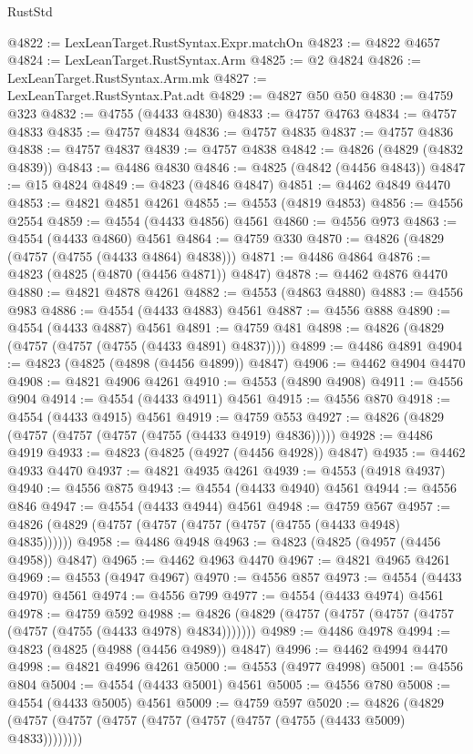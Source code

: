\begin{lexlean}{RustStd}
\begin{coremodule}
@4822 := LexLeanTarget.RustSyntax.Expr.matchOn
@4823 := @4822 @4657
@4824 := LexLeanTarget.RustSyntax.Arm
@4825 := @2 @4824
@4826 := LexLeanTarget.RustSyntax.Arm.mk
@4827 := LexLeanTarget.RustSyntax.Pat.adt
@4829 := @4827 @50 @50
@4830 := @4759 @323
@4832 := @4755 (@4433 @4830)
@4833 := @4757 @4763
@4834 := @4757 @4833
@4835 := @4757 @4834
@4836 := @4757 @4835
@4837 := @4757 @4836
@4838 := @4757 @4837
@4839 := @4757 @4838
@4842 := @4826 (@4829 (@4832 @4839))
@4843 := @4486 @4830
@4846 := @4825 (@4842 (@4456 @4843))
@4847 := @15 @4824
@4849 := @4823 (@4846 @4847)
@4851 := @4462 @4849 @4470
@4853 := @4821 @4851 @4261
@4855 := @4553 (@4819 @4853)
@4856 := @4556 @2554
@4859 := @4554 (@4433 @4856) @4561
@4860 := @4556 @973
@4863 := @4554 (@4433 @4860) @4561
@4864 := @4759 @330
@4870 := @4826 (@4829 (@4757 (@4755 (@4433 @4864) @4838)))
@4871 := @4486 @4864
@4876 := @4823 (@4825 (@4870 (@4456 @4871)) @4847)
@4878 := @4462 @4876 @4470
@4880 := @4821 @4878 @4261
@4882 := @4553 (@4863 @4880)
@4883 := @4556 @983
@4886 := @4554 (@4433 @4883) @4561
@4887 := @4556 @888
@4890 := @4554 (@4433 @4887) @4561
@4891 := @4759 @481
@4898 := @4826 (@4829 (@4757 (@4757 (@4755 (@4433 @4891) @4837))))
@4899 := @4486 @4891
@4904 := @4823 (@4825 (@4898 (@4456 @4899)) @4847)
@4906 := @4462 @4904 @4470
@4908 := @4821 @4906 @4261
@4910 := @4553 (@4890 @4908)
@4911 := @4556 @904
@4914 := @4554 (@4433 @4911) @4561
@4915 := @4556 @870
@4918 := @4554 (@4433 @4915) @4561
@4919 := @4759 @553
@4927 := @4826 (@4829 (@4757 (@4757 (@4757 (@4755 (@4433 @4919) @4836)))))
@4928 := @4486 @4919
@4933 := @4823 (@4825 (@4927 (@4456 @4928)) @4847)
@4935 := @4462 @4933 @4470
@4937 := @4821 @4935 @4261
@4939 := @4553 (@4918 @4937)
@4940 := @4556 @875
@4943 := @4554 (@4433 @4940) @4561
@4944 := @4556 @846
@4947 := @4554 (@4433 @4944) @4561
@4948 := @4759 @567
@4957 := @4826 (@4829 (@4757 (@4757 (@4757 (@4757 (@4755 (@4433 @4948) @4835))))))
@4958 := @4486 @4948
@4963 := @4823 (@4825 (@4957 (@4456 @4958)) @4847)
@4965 := @4462 @4963 @4470
@4967 := @4821 @4965 @4261
@4969 := @4553 (@4947 @4967)
@4970 := @4556 @857
@4973 := @4554 (@4433 @4970) @4561
@4974 := @4556 @799
@4977 := @4554 (@4433 @4974) @4561
@4978 := @4759 @592
@4988 := @4826 (@4829 (@4757 (@4757 (@4757 (@4757 (@4757 (@4755 (@4433 @4978) @4834)))))))
@4989 := @4486 @4978
@4994 := @4823 (@4825 (@4988 (@4456 @4989)) @4847)
@4996 := @4462 @4994 @4470
@4998 := @4821 @4996 @4261
@5000 := @4553 (@4977 @4998)
@5001 := @4556 @804
@5004 := @4554 (@4433 @5001) @4561
@5005 := @4556 @780
@5008 := @4554 (@4433 @5005) @4561
@5009 := @4759 @597
@5020 := @4826 (@4829 (@4757 (@4757 (@4757 (@4757 (@4757 (@4757 (@4755 (@4433 @5009) @4833))))))))

\end{coremodule}
\end{lexlean}
